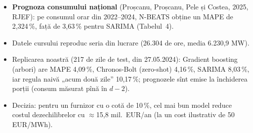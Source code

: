 \begin{itemize}\setlength{\itemsep}{2pt}
  \item \textbf{Prognoza consumului național} (Proșcanu, Proșcanu, Pele și Costea, 2025, RJEF): pe consumul orar din 2022--2024, N-BEATS obține un MAPE de 2,324\,\%, față de 3,63\,\% pentru SARIMA (Tabelul~4).
  \item Datele cursului reproduc seria din lucrare (26.304 de ore, media 6.230,9 MW).
  \item Replicarea noastră (217 de zile de test, din 27.05.2024): Gradient boosting (arbori) are MAPE 4,09\,\%, Chronos-Bolt (zero-shot) 4,16\,\%, SARIMA 8,03\,\%, iar regula naivă „acum două zile” 10,17\,\%; prognozele sînt emise la închiderea porții (consum măsurat pînă în $d-2$).
  \item Decizia: pentru un furnizor cu o cotă de 10\,\%, cel mai bun model reduce costul dezechilibrelor cu $\approx$15,8 mil.\ EUR/an (la un cost ilustrativ de 50 EUR/MWh).
\end{itemize}
